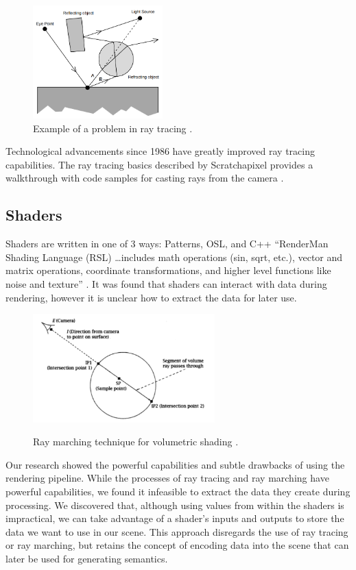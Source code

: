 \documentclass[conference]{IEEEtran}
\begin{document}
\begin{figure}[htbp]
\centerline{\includegraphics[width=5cm]{raytrace.png}}
\caption{Example of a problem in ray tracing \cite{backwards_raytrace}.}
\label{fig:raytrace}
\end{figure}

Technological advancements since 1986 have greatly improved ray tracing capabilities.
The ray tracing basics described by Scratchapixel 
provides a walkthrough with code samples for casting rays from the camera
\cite{raytrace_walkthrough}.

\subsection{Shaders}
Shaders are written in one of 3 ways: Patterns, OSL, and C++ \cite{shading}
``RenderMan Shading Language (RSL) \dots includes math operations (sin, sqrt, etc.),
vector and matrix operations, coordinate transformations, and higher level functions like noise and texture''
\cite{renderman_docs}.
It was found that shaders can interact with data during rendering,
however it is unclear how to extract the data for later use.

\begin{figure}[htbp]
\centering
{\includegraphics[width=7cm]{ray_marching.png}}
\caption{Ray marching technique for volumetric shading \cite{ray_marching}.}
\label{fig:ray_marching}
\end{figure}

Our research showed the powerful capabilities and subtle drawbacks of using
the rendering pipeline.
While the processes of ray tracing and ray marching have powerful capabilities,
we found it infeasible to extract the data they create during processing.
We discovered that, although using values from within the shaders is impractical,
we can take advantage of a shader's inputs and outputs to store the data we want to
use in our scene.
This approach disregards the use of ray tracing or ray marching,
but retains the concept of encoding data into the scene that can later be used
for generating semantics.
\end{document}
